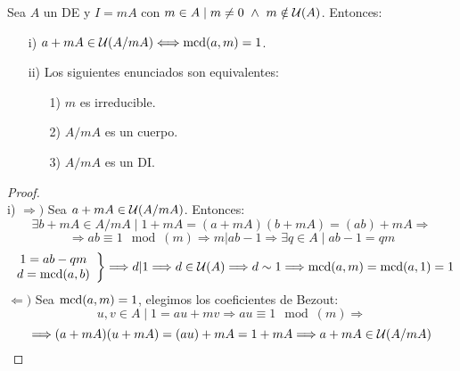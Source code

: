 \begin{teo}
    \label{teoEquivAnilloCociente}
    Sea $A$ un DE y $I=mA$ con $m\in A \mid m\neq 0 \ \land \  m\notin \mathcal{U}(A)$.
    Entonces:
    \begin{enumerate}
        \item[i)] $a+mA \in \mathcal{U}(A/mA) \Longleftrightarrow \operatorname{mcd}(a,m)=1$.
        \item[ii)]Los siguientes enunciados son equivalentes:
            \begin{enumerate}
                \item[1)] $m$ es irreducible.
                \item[2)] $A/mA$ es un cuerpo.
                \item[3)] $A/mA$ es un DI.
            \end{enumerate}
    \end{enumerate}
\begin{proof}
    \ \\
    i)\newline
    $\Longrightarrow)$ Sea $a+mA \in \mathcal{U}(A/mA)$. Entonces:
    $$\exists b+mA \in A/mA \mid 1+mA=(a+mA)(b+mA) = (ab)+mA \Longrightarrow$$
    $$\Longrightarrow ab\equiv 1\mod(m) \Longrightarrow m|ab-1 \Longrightarrow \exists q\in A \mid ab-1=qm$$
    $$\left. \begin{array}{c}
            1=ab-qm \\
            d=\operatorname{mcd}(a,b)
        \end{array} \right\} \Longrightarrow d|1 \Longrightarrow d\in \mathcal{U}(A) \Longrightarrow d\sim 1 \Longrightarrow \operatorname{mcd}(a,m) = \operatorname{mcd}(a,1) = 1$$
    $\Longleftarrow)$
    Sea $\operatorname{mcd}(a,m)=1$, elegimos los coeficientes de Bezout:
    $$u,v \in A \mid 1=au + mv \Longrightarrow au \equiv 1 \mod(m) \Longrightarrow$$
    $$ \Longrightarrow (a+mA)(u+mA)=(au)+mA = 1+mA \Longrightarrow a+mA \in \mathcal{U}(A/mA)$$

    \bigskip
    

\end{proof}
\end{teo}
